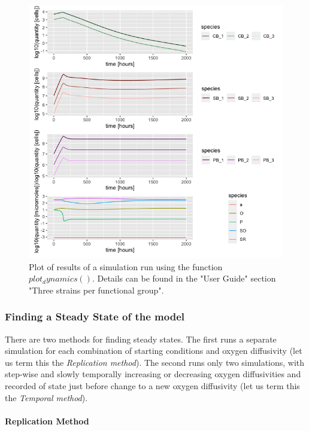 \documentclass[]{elsarticle} %
\begin{document}
\begin{figure}

{\centering \includegraphics[width=500px]{figures/ug_three_strains_dynamics} 

}

\caption{Plot of results of a simulation run using the function $plot_dynamics()$. Details can be found in the "User Guide" section "Three strains per functional group".}\label{fig:plot-dynamics}
\end{figure}

\hypertarget{finding-a-steady-state-of-the-model}{%
\subsubsection{Finding a Steady State of the
model}\label{finding-a-steady-state-of-the-model}}

There are two methods for finding steady states. The first runs a
separate simulation for each combination of starting conditions and
oxygen diffusivity (let us term this the \emph{Replication method}). The
second runs only two simulations, with step-wise and slowly temporally
increasing or decreasing oxygen diffusivities and recorded of state just
before change to a new oxygen diffusivity (let us term this the
\emph{Temporal method}).

\hypertarget{replication-method}{%
\paragraph{Replication Method}\label{replication-method}}
\end{document}
